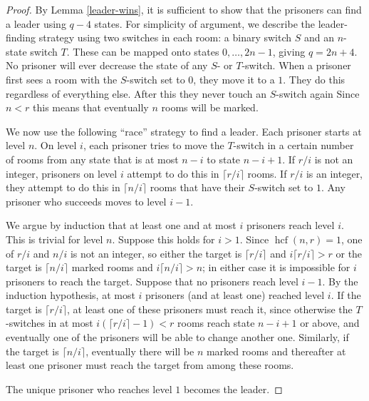 \documentclass[a4paper,11pt]{extarticle}
\theoremstyle{definition}
\theoremstyle{remark}
\newcommand{\hcf}{\operatorname{hcf}}
\begin{document}
	\begin{proof}
		By Lemma \ref{leader-wins}, it is sufficient to show that the prisoners can find a leader using $q-4$ states. For simplicity of argument, we describe the leader-finding strategy using two switches in each room: a binary switch $S$ and an $n$-state switch $T$. These can be mapped onto states $0,\ldots, 2n-1$, giving $q=2n+4$.
		No prisoner will ever decrease the state of any $S$- or $T$-switch. When a prisoner first sees a room with the $S$-switch set to $0$, they move it to a $1$. They do this regardless of everything else. After this they never touch an $S$-switch again 
		Since $n < r$ this means that eventually $n$ rooms will be marked.
		
		We now use the following ``race'' strategy to find a leader. Each prisoner starts at level $n$. 
		On level $i$, each prisoner tries to move the $T$-switch in a certain number of rooms from any state that is at most $n-i$ to state $n-i+1$. 
		If $r/i$ is not an integer, prisoners on level $i$ attempt to do this in $\lceil r/i\rceil$ rooms. If $r/i$ is an integer, they attempt to do this in $\lceil n/i\rceil$
		rooms that have their $S$-switch set to $1$. Any prisoner who succeeds moves to level $i-1$.
		
		We argue by induction that at least one and at most $i$ prisoners reach level $i$. This is trivial
		for level $n$. Suppose this holds for $i > 1$. Since $\hcf(n, r) = 1$, one of $r/i$ and $n/i$ is not an integer,
		so either the target is $\lceil r/i\rceil$ and $i\lceil r/i\rceil>r$ or the target is $\lceil n/i\rceil$ marked rooms and $i\lceil n/i\rceil>n$; 
		in either case it is impossible for $i$ prisoners to reach the target. Suppose that no prisoners reach level $i-1$. By the induction
		hypothesis, at most $i$ prisoners (and at least one) reached level $i$. If the target is $\lceil r/i\rceil$, at least one of these prisoners must reach it,
		since otherwise the $T$-switches in at most $i(\lceil r/i\rceil-1) < r$ rooms reach state $n-i+1$ or above, and eventually one of the prisoners will be able to change another one.
		Similarly, if the target is $\lceil n/i\rceil$, eventually there will be $n$ marked rooms and thereafter at least one prisoner must reach the target from among these rooms.
		
		The unique prisoner who reaches level $1$ becomes the leader. 
	\end{proof}
	
\end{document}
